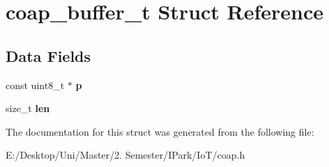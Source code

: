 \hypertarget{structcoap__buffer__t}{}\section{coap\+\_\+buffer\+\_\+t Struct Reference}
\label{structcoap__buffer__t}
\subsection*{Data Fields}
\begin{DoxyCompactItemize}
\item 
\mbox{\label{structcoap__buffer__t_acc67bd7fa206fcf34b2863fb1e41e54f}} 
const uint8\+\_\+t $\ast$ {\bfseries p}
\item 
\mbox{\label{structcoap__buffer__t_a7360b55975153b822efc5217b7734e6a}} 
size\+\_\+t {\bfseries len}
\end{DoxyCompactItemize}


The documentation for this struct was generated from the following file\+:\begin{DoxyCompactItemize}
\item 
E\+:/\+Desktop/\+Uni/\+Master/2. Semester/\+I\+Park/\+Io\+T/coap.\+h\end{DoxyCompactItemize}
